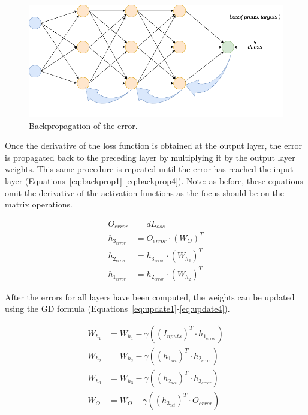 \begin{figure}[!htbp]
    \centering
    \includegraphics[width=.5\textwidth]{Images/backprop.png}
    \caption{Backpropagation of the error.}
    \label{fig:backprop}
\end{figure}

Once the derivative of the loss function is obtained at the output layer, the
error is propagated back to the preceding layer by multiplying it by the output
layer weights. This same procedure is repeated until the error has reached the
input layer (Equations~\ref{eq:backprop1}-\ref{eq:backprop4}). Note: as before,
these equations omit the derivative of the activation functions as the focus
should be on the matrix operations. 

\begin{align}
    O_{\textit{error}} &= dL_\textit{oss} \label{eq:backprop1}\\
        h_{3_{\textit{error}}} &= O_{\textit{error}} \cdot (W_{O})^T \label{eq:backprop2}\\
        h_{2_{\textit{error}}} &= h_{3_{\textit{error}}} \cdot (W_{h_3})^T \label{eq:backprop3}\\
        h_{1_{\textit{error}}} &= h_{2_{\textit{error}}} \cdot (W_{h_2})^T \label{eq:backprop4}
\end{align}

After the errors for all layers have been computed, the weights can be updated
using the GD formula (Equations~\ref{eq:update1}-\ref{eq:update4}).

\begin{align}
    W_{h_1} &= W_{h_1} - \gamma ((I_\textit{nputs})^T \cdot h_{1_{\textit{error}}}) \label{eq:update1} \\
    W_{h_2} &= W_{h_2} - \gamma ((h_{1_{\textit{act}}})^T \cdot h_{2_{\textit{error}}}) \label{eq:update2} \\
    W_{h_3} &= W_{h_3} - \gamma ((h_{2_{\textit{act}}})^T \cdot h_{3_{\textit{error}}}) \label{eq:update3} \\
    W_{O} &= W_{O} - \gamma ((h_{3_{\textit{act}}})^T \cdot O_{\textit{error}}) \label{eq:update4}
\end{align}


